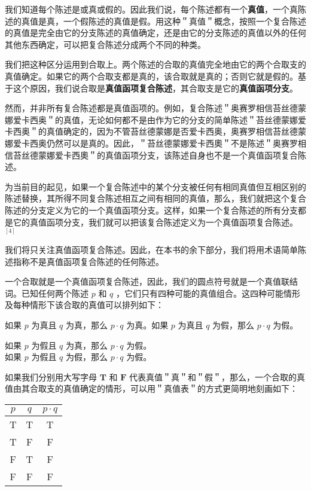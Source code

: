 我们知道每个陈述是或真或假的。因此我们说，每个陈述都有一个\textbf{真值}，一个真陈述的真值是真，一个假陈述的真值是假。用这种＂真值＂概念，按照一个复合陈述的真值是完全由它的分支陈述的真值确定，还是由它的分支陈述的真值以外的任何其他东西确定，可以把复合陈述分成两个不同的种类。

我们把这种区分运用到合取上。两个陈述的合取的真值完全地由它的两个合取支的真值确定。如果它的两个合取支都是真的，该合取就是真的；否则它就是假的。基于这个原因，我们说合取是\textbf{真值函项复合陈述}，其合取支是它的\textbf{真值函项分支}。

然而，并非所有复合陈述都是真值函项的。例如，复合陈述＂奥赛罗相信苔丝德蒙娜爱卡西奥＂的真值，无论如何都不是由作为它的分支的简单陈述＂苔丝德蒙娜爱卡西奥＂的真值确定的，因为不管苔丝德蒙娜是否爱卡西奥，奥赛罗相信苔丝德蒙娜爱卡西奥仍然可以是真的。因此，＂苔丝德蒙娜爱卡西奧＂不是陈述＂奥赛罗相信苔丝德蒙娜爱卡西奧＂的真值函项分支，该陈述自身也不是一个真值函项复合陈述。

为当前目的起见，如果一个复合陈述中的某个分支被任何有相同真值但互相区别的陈述替换，其所得不同复合陈述相互之间有相同的真值，那么，我们就把这个复合陈述的分支定义为它的一个真值函项分支。这样，如果一个复合陈述的所有分支都是它的真值函项分支，我们就可以把该复合陈述定义为一个真值函项复合陈述。 ${ }^{[4]}$

我们将只关注真值函项复合陈述。因此，在本书的余下部分，我们将用术语简单陈述指称不是真值函项复合陈述的任何陈述。

一个合取就是一个真值函项复合陈述，因此，我们的圆点符号就是一个真值联结词。已知任何两个陈述 $p$ 和 $q$ ，它们只有四种可能的真值组合。这四种可能情形及每种情形下该合取的真值可以排列如下：

如果 $p$ 为真且 $q$ 为真，那么 $p \cdot q$ 为真。如果 $p$ 为真且 $q$ 为假，那么 $p \cdot q$ 为假。

如果 $p$ 为假且 $q$ 为真，那么 $p \cdot q$ 为假。\\
如果 $p$ 为假且 $q$ 为假，那么 $p \cdot q$ 为假。

如果我们分别用大写字母 $\mathbf{T}$ 和 $\mathbf{F}$ 代表真值＂真＂和＂假＂，那么，一个合取的真值由其合取支的真值确定的情形，可以用＂真值表＂的方式更简明地刻画如下：

\begin{center}
\begin{tabular}{|ccc|}
\hline
$p$ & $q$ & $p \cdot q$ \\
\hline
T & T & T \\
T & F & F \\
F & T & F \\
F & F & F \\
\hline
\end{tabular}
\end{center}

